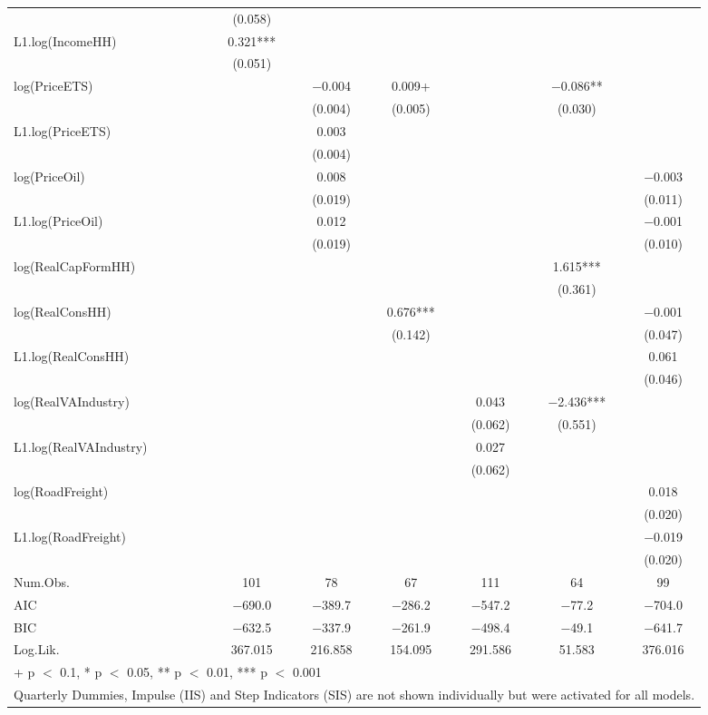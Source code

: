 \begin{table}
{\begin{tabular}[t]{lcccccc}
 & (\num{0.058}) &  &  &  &  & \\
L1.log(IncomeHH) & \num{0.321}*** &  &  &  &  & \\
 & (\num{0.051}) &  &  &  &  & \\
log(PriceETS) &  & \num{-0.004} & \num{0.009}+ &  & \num{-0.086}** & \\
 &  & (\num{0.004}) & (\num{0.005}) &  & (\num{0.030}) & \\
L1.log(PriceETS) &  & \num{0.003} &  &  &  & \\
 &  & (\num{0.004}) &  &  &  & \\
log(PriceOil) &  & \num{0.008} &  &  &  & \num{-0.003}\\
 &  & (\num{0.019}) &  &  &  & (\num{0.011})\\
L1.log(PriceOil) &  & \num{0.012} &  &  &  & \num{-0.001}\\
 &  & (\num{0.019}) &  &  &  & (\num{0.010})\\
log(RealCapFormHH) &  &  &  &  & \num{1.615}*** & \\
 &  &  &  &  & (\num{0.361}) & \\
log(RealConsHH) &  &  & \num{0.676}*** &  &  & \num{-0.001}\\
 &  &  & (\num{0.142}) &  &  & (\num{0.047})\\
L1.log(RealConsHH) &  &  &  &  &  & \num{0.061}\\
 &  &  &  &  &  & (\num{0.046})\\
log(RealVAIndustry) &  &  &  & \num{0.043} & \num{-2.436}*** & \\
 &  &  &  & (\num{0.062}) & (\num{0.551}) & \\
L1.log(RealVAIndustry) &  &  &  & \num{0.027} &  & \\
 &  &  &  & (\num{0.062}) &  & \\
log(RoadFreight) &  &  &  &  &  & \num{0.018}\\
 &  &  &  &  &  & \vphantom{1} (\num{0.020})\\
L1.log(RoadFreight) &  &  &  &  &  & \num{-0.019}\\
 &  &  &  &  &  & (\num{0.020})\\
\midrule
Num.Obs. & \num{101} & \num{78} & \num{67} & \num{111} & \num{64} & \num{99}\\
AIC & \num{-690.0} & \num{-389.7} & \num{-286.2} & \num{-547.2} & \num{-77.2} & \num{-704.0}\\
BIC & \num{-632.5} & \num{-337.9} & \num{-261.9} & \num{-498.4} & \num{-49.1} & \num{-641.7}\\
Log.Lik. & \num{367.015} & \num{216.858} & \num{154.095} & \num{291.586} & \num{51.583} & \num{376.016}\\
\bottomrule
\multicolumn{7}{l}{\rule{0pt}{1em}+ p $<$ 0.1, * p $<$ 0.05, ** p $<$ 0.01, *** p $<$ 0.001}\\
\multicolumn{7}{l}{\rule{0pt}{1em}Quarterly Dummies, Impulse (IIS) and Step Indicators (SIS) are not shown individually but were activated for all models.}\\
\end{tabular}}
\end{table}
